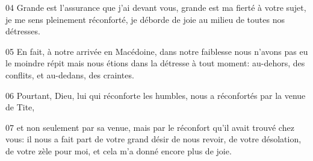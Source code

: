 
04 Grande est l’assurance que j’ai devant vous, grande est ma fierté à votre sujet, je me sens pleinement réconforté, je déborde de joie au milieu de toutes nos détresses.

05 En fait, à notre arrivée en Macédoine, dans notre faiblesse nous n’avons pas eu le moindre répit mais nous étions dans la détresse à tout moment: au-dehors, des conflits, et au-dedans, des craintes.

06 Pourtant, Dieu, lui qui réconforte les humbles, nous a réconfortés par la venue de Tite,

07 et non seulement par sa venue, mais par le réconfort qu’il avait trouvé chez vous: il nous a fait part de votre grand désir de nous revoir, de votre désolation, de votre zèle pour moi, et cela m’a donné encore plus de joie.
